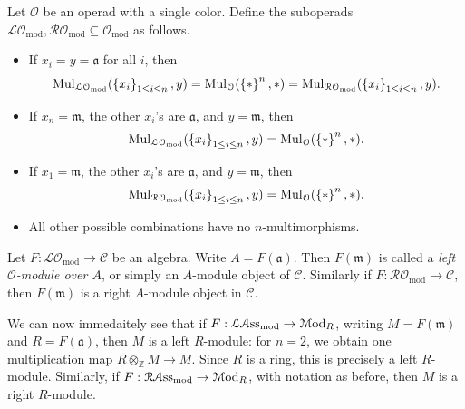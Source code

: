 \begin{definition}\label{1.4.6}
	Let $\mathcal{O} $ be an operad with a single color. Define the suboperads $\mathcal{L} \mathcal{O}_{\mathrm{mod} },\mathcal{R} \mathcal{O} _{\mathrm{mod} } \subseteq \mathcal{O} _{\mathrm{mod} } $ as follows.
	\begin{itemize}
		\item If $x_i=y=\mathfrak{a} $ for all $i$, then
	\[
		\operatorname{Mul}_{\mathcal{L} \mathcal{O} _{\mathrm{mod} } } (\left\{ x_i \right\} _{1\leq i\leq n} ,y)=\operatorname{Mul}_{\mathcal{O} } (\left\{ * \right\} ^n ,*)=\operatorname{Mul}_{\mathcal{R} \mathcal{O} _{\mathrm{mod} } } (\left\{ x_i \right\} _{1\leq i\leq n} ,y)
	.\]
		\item If $x_n=\mathfrak{m} $, the other $x_i$'s are $\mathfrak{a} $, and $y=\mathfrak{m} $, then
	\[
		\operatorname{Mul}_{\mathcal{L} \mathcal{O} _{\mathrm{mod} } } (\left\{ x_i \right\} _{1\leq i\leq n} ,y)=\operatorname{Mul}_{\mathcal{O} } (\left\{ * \right\}^n ,*)
	.\]
		\item If $x_1=\mathfrak{m} $, the other $x_i$'s are $\mathfrak{a} $, and $y=\mathfrak{m} $, then
	\[
		\operatorname{Mul}_{\mathcal{R} \mathcal{O} _{\mathrm{mod} } } (\left\{ x_i \right\} _{1\leq i\leq n} ,y)=\operatorname{Mul}_{\mathcal{O} } (\left\{ * \right\}^n ,*)
	.\]
		\item All other possible combinations have no $n$-multimorphisms.
	\end{itemize}
	Let $F : \mathcal{L} \mathcal{O}_{\mathrm{mod}}   \to \mathcal{C} $ be an algebra. Write $A=F(\mathfrak{a} )$. Then $F(\mathfrak{m} )$ is called a \emph{left $\mathcal{O} $-module over $A$}, or simply an $A$-module object of $\mathcal{C} $. Similarly if $F : \mathcal{R} \mathcal{O} _{\mathrm{mod} }  \to \mathcal{C} $, then $F(\mathfrak{m} )$ is a right $A$-module object in $\mathcal{C} $.
\end{definition}

\begin{example}\label{1.4.7}
	We can now immedaitely see that if $F : \mathcal{L} \mathcal{A}\mathrm{ss}_{\mathrm{mod}}  \to \mathcal{M}\mathrm{od} _R$, writing $M=F(\mathfrak{m} )$ and $R=F(\mathfrak{a} )$, then $M$ is a left $R$-module: for $n=2$, we obtain one multiplication map $R\otimes _\mathbb{Z} M\to M$. Since $R$ is a ring, this is precisely a left $R$-module. Similarly, if $F : \mathcal{R} \mathcal{A} \mathrm{ss} _{\mathrm{mod}}  \to \mathcal{M}\mathrm{od} _R$, with notation as before, then $M$ is a right $R$-module.
\end{example}

